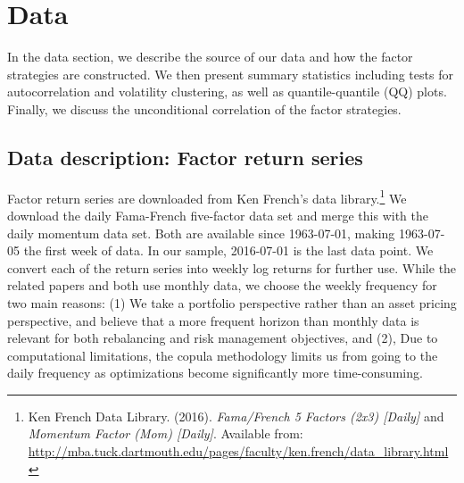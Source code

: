 \section{Data}
\label{sec:data}
In the data section, we describe the source of our data and how the factor strategies are constructed. We then present summary statistics including tests for autocorrelation and volatility clustering, as well as quantile-quantile (QQ) plots. Finally, we discuss the unconditional correlation of the factor strategies.

\subsection{Data description: Factor return series}

Factor return series are downloaded from Ken French's data library.\footnote{Ken French Data Library. (2016). \textit{Fama/French 5 Factors (2x3) [Daily]} and \textit{Momentum Factor (Mom) [Daily]}. Available from: \url{http://mba.tuck.dartmouth.edu/pages/faculty/ken.french/data_library.html}} We download the daily Fama-French five-factor data set and merge this with the daily momentum data set. Both are available since 1963-07-01, making 1963-07-05 the first week of data. In our sample, 2016-07-01 is the last data point. We convert each of the return series into weekly log returns for further use. While the related papers \textcite{FF2015} and \textcite{Asness2015} both use monthly data, we choose the weekly frequency for two main reasons: (1) We take a portfolio perspective rather than an asset pricing perspective, and believe that a more frequent horizon than monthly data is relevant for both rebalancing and risk management objectives, and (2), Due to computational limitations, the copula methodology limits us from going to the daily frequency as optimizations become significantly more time-consuming.

